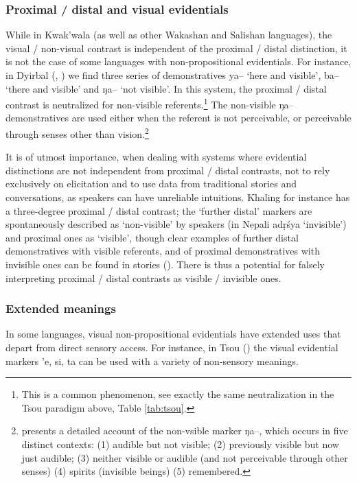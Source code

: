 \documentclass[oneside,a4paper,11pt]{article}
\newcommand{\ipa}[1]{{\phon \mbox{#1}}} %
\begin{document}
 
\subsubsection{Proximal / distal and visual evidentials} \label{sec:proximal}
While in Kwak'wala (as well as other Wakashan and Salishan languages), the visual / non-visual contrast is independent of the proximal / distal distinction, it is not the case of some languages with non-propositional evidentials. For instance, in Dyirbal (\citealt[45]{dixon72dyirbal}, \citealt{dixon14nonvisible}) we find three series of demonstratives \ipa{ya--} `here and visible', \ipa{ba--} `there and visible' and \ipa{ŋa--} `not visible'. In this system, the proximal / distal contrast is neutralized for non-visible referents.\footnote{This is a common phenomenon, see exactly the same neutralization in the Tsou paradigm above, Table \ref{tab:tsou}.} The non-visible \ipa{ŋa--} demonstratives are used either when the referent is not perceivable, or perceivable through senses other than vision.\footnote{\citet{dixon14nonvisible} presents a detailed account of the non-vsible marker  \ipa{ŋa--}, which occurs in five distinct contexts: (1) audible but not visible; (2) previously visible but now just audible; (3) neither visible or audible (and not perceivable through other senses) (4) spirits (invisible beings) (5) remembered.  } 

It is of utmost importance, when dealing with systems where evidential distinctions are not independent from proximal / distal contrasts, not to rely exclusively on elicitation and to use data from traditional stories and conversations, as speakers can have unreliable intuitions. Khaling for instance has a three-degree proximal / distal contrast; the `further distal' markers are spontaneously described as `non-visible' by speakers (in Nepali \ipa{adṛśya} `invisible') and proximal ones as `visible', though clear examples of further distal demonstratives with visible referents, and of proximal demonstratives with invisible ones can be found in stories (\citealt[399]{jacques14auditory}). There is thus a potential for falsely interpreting proximal / distal contrasts as visible / invisible ones.

\subsubsection{Extended meanings} \label{sec:extended.visible}
In some languages, visual non-propositional evidentials have extended uses that depart from direct sensory access. For instance, in Tsou (\citealt[55-8]{yang00tsou.case}) the visual evidential markers \ipa{'e},  \ipa{si},  \ipa{ta} can be used with a variety of non-sensory meanings. 
\end{document}
